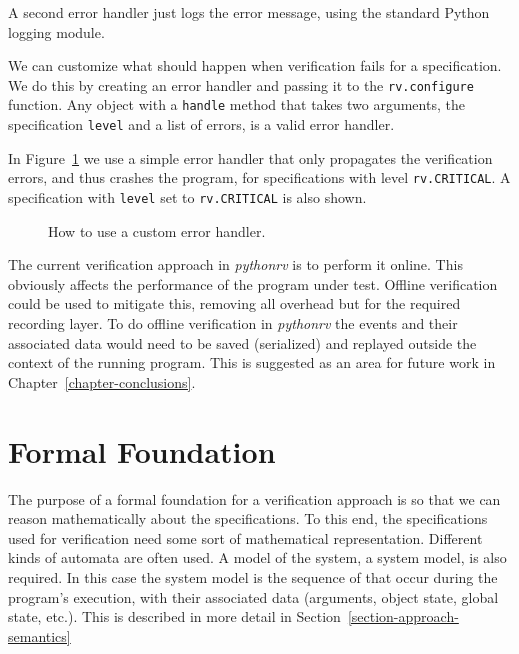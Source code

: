 \documentclass[a4paper,11pt]{kth-mag}
\theoremstyle{definition}
\begin{document}
A second error handler just logs the error message, using the standard Python
logging module.

We can customize what should happen when verification fails for a
specification. We do this by creating an error handler and passing it to the
\texttt{rv.configure} function. Any object with a \texttt{handle} method that
takes two arguments, the specification \texttt{level} and a list of errors, is
a valid error handler.

In Figure~\ref{figure-configure-error-handler} we use a simple error handler
that only propagates the verification errors, and thus crashes the program, for
specifications with level \texttt{rv.CRITICAL}. A specification with
\texttt{level} set to \texttt{rv.CRITICAL} is also shown.

\begin{figure}[h!]
	\begin{center}
	\begin{minipage}{0.7\textwidth}
	
	\end{minipage}
	\end{center}

  \caption{How to use a custom error handler.}
	\label{figure-configure-error-handler}
\end{figure}

The current verification approach in \textit{pythonrv} is to perform it online.
This obviously affects the performance of the program under test. Offline
verification could be used to mitigate this, removing all overhead but for the
required recording layer. To do offline verification in \textit{pythonrv} the
events and their associated data would need to be saved (serialized) and
replayed outside the context of the running program. This is suggested as an
area for future work in Chapter~\ref{chapter-conclusions}.



\section{Formal Foundation} \label{section-approach-formal-foundation}

The purpose of a formal foundation for a verification approach is so that we
can reason mathematically about the specifications. To this end, the
specifications used for verification need some sort of mathematical
representation. Different kinds of automata are often used. A model of the
system, a system model, is also required. In this case the system model is the
sequence of that occur during the program's execution, with their associated
data (arguments, object state, global state, etc.). This is described in more
detail in Section~\ref{section-approach-semantics}
\end{document}
